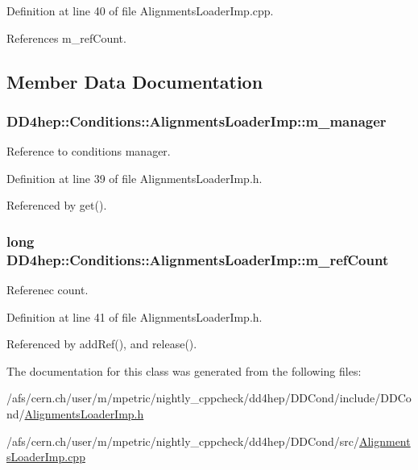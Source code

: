 Definition at line 40 of file AlignmentsLoaderImp.cpp.

References m\_\-refCount.

\subsection{Member Data Documentation}
\hypertarget{class_d_d4hep_1_1_conditions_1_1_alignments_loader_imp_a448202e08fc26fb95d13fd86993b3685}{
\subsubsection[{m\_\-manager}]{ {\bf DD4hep::Conditions::AlignmentsLoaderImp::m\_\-manager}}}
\label{class_d_d4hep_1_1_conditions_1_1_alignments_loader_imp_a448202e08fc26fb95d13fd86993b3685}


Reference to conditions manager. 

Definition at line 39 of file AlignmentsLoaderImp.h.

Referenced by get().\hypertarget{class_d_d4hep_1_1_conditions_1_1_alignments_loader_imp_a806e6a616a116ada0a4a9876c0cc1119}{
\subsubsection[{m\_\-refCount}]{\setlength{\rightskip}{0pt plus 5cm}long {\bf DD4hep::Conditions::AlignmentsLoaderImp::m\_\-refCount}}}
\label{class_d_d4hep_1_1_conditions_1_1_alignments_loader_imp_a806e6a616a116ada0a4a9876c0cc1119}


Referenec count. 

Definition at line 41 of file AlignmentsLoaderImp.h.

Referenced by addRef(), and release().

The documentation for this class was generated from the following files:\begin{DoxyCompactItemize}
\item 
/afs/cern.ch/user/m/mpetric/nightly\_\-cppcheck/dd4hep/DDCond/include/DDCond/\hyperlink{_alignments_loader_imp_8h}{AlignmentsLoaderImp.h}\item 
/afs/cern.ch/user/m/mpetric/nightly\_\-cppcheck/dd4hep/DDCond/src/\hyperlink{_alignments_loader_imp_8cpp}{AlignmentsLoaderImp.cpp}\end{DoxyCompactItemize}

